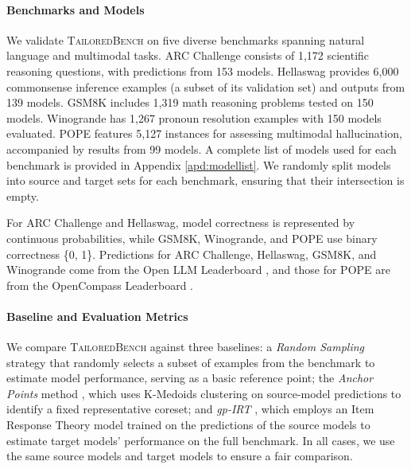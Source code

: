 \paragraph{Benchmarks and Models} 
We validate \textsc{TailoredBench} on five diverse benchmarks spanning natural language and multimodal tasks. ARC Challenge \citep{clark2018arc} consists of 1,172 scientific reasoning questions, with predictions from 153 models. Hellaswag \citep{zellers2019hellaswag} provides 6,000 commonsense inference examples (a subset of its validation set) and outputs from 139 models. GSM8K \citep{cobbe2021GSM8K} includes 1,319 math reasoning problems tested on 150 models. Winogrande \citep{sakaguchi2021winogrande} has 1,267 pronoun resolution examples with 150 models evaluated. POPE \citep{li2023pope} features 5,127 instances for assessing multimodal hallucination, accompanied by results from 99 models. A complete list of models used for each benchmark is provided in Appendix \ref{apd:modellist}. We randomly split models into source and target sets for each benchmark, ensuring that their intersection is empty. 

For ARC Challenge and Hellaswag, model correctness is represented by continuous probabilities, while GSM8K, Winogrande, and POPE use binary correctness \{0, 1\}. Predictions for ARC Challenge, Hellaswag, GSM8K, and Winogrande come from the Open LLM Leaderboard \citep{open-llm-leaderboard}, and those for POPE are from the OpenCompass Leaderboard \citep{2023opencompass}. 


\paragraph{Baseline and Evaluation Metrics} We compare \textsc{TailoredBench} against three baselines: a \textit{Random Sampling} strategy that randomly selects a subset of examples from the benchmark to estimate model performance, serving as a basic reference point; the \textit{Anchor Points} method \citep{AP}, which uses K-Medoids clustering on source-model predictions to identify a fixed representative coreset; and \textit{gp-IRT} \citep{tiny}, which employs an Item Response Theory model trained on the predictions of the source models to estimate target models' performance on the full benchmark. In all cases, we use the same source models and target models to ensure a fair comparison.


